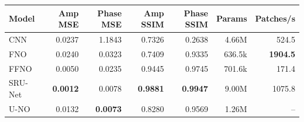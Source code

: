 \begin{tabular}{@{}lrrrrrr@{}}
\toprule
Model & Amp MSE & Phase MSE & Amp SSIM & Phase SSIM & Params & Patches/s \\
\midrule
CNN & 0.0237 & 1.1843 & 0.7326 & 0.2638 & 4.66M & 524.5 \\
FNO & 0.0240 & 0.0323 & 0.7409 & 0.9335 & 636.5k & \textbf{1904.5} \\
FFNO & 0.0050 & 0.0235 & 0.9445 & 0.9745 & 701.6k & 171.4 \\
SRU-Net & \textbf{0.0012} & 0.0078 & \textbf{0.9881} & \textbf{0.9947} & 9.00M & 1075.8 \\
U-NO & 0.0132 & \textbf{0.0073} & 0.8280 & 0.9569 & 1.26M & -- \\
\bottomrule
\end{tabular}
